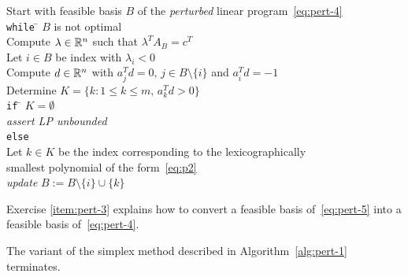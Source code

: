 \begin{algorithm}
  \label{alg:pert-1}
 \begin{tabbing}
      Start with feasible basis $B$ of the \emph{perturbed} linear program~\eqref{eq:pert-4} \\[1ex]
      {\tt while} \= $B$ is not optimal \\ [.7ex]
      \> Compute $\lambda \in \mathbb{R}^n$ such that $\lambda^TA_B = c^T$ \\
      \> Let $i \in B$ be index with $\lambda_i<0$ \\
      \> Compute  $d \in \mathbb{R}^n$ with $a_j^T d = 0, \, j \in B \setminus\{i\}$
      and $a_i^T d = -1$ \\ 
      \> Determine $K = \{ k \colon 1 \leq k \leq m, \, a_k^Td >0\}$\\[.7ex]  
      \> {\tt if} \= $K = \emptyset$ \\   
      \> \> \emph{assert LP unbounded} \\
      \> {\tt else} \\
      \> \> Let $k \in K$ be the index corresponding to the lexicographically\\
      \> \> smallest polynomial of the form~\eqref{eq:p2} \\

      \> \>\emph{update} $B := B \setminus\{i\} \cup \{k\}$             
    \end{tabbing}
    
  \end{algorithm}
%
Exercise \ref{item:pert-3} explains how to convert a feasible basis of~\eqref{eq:pert-5} into a feasible basis of~\eqref{eq:pert-4}. 

\begin{theorem}
  \label{thr:6}
  The variant of the simplex method described in Algorithm~\ref{alg:pert-1} terminates. 
\end{theorem}


